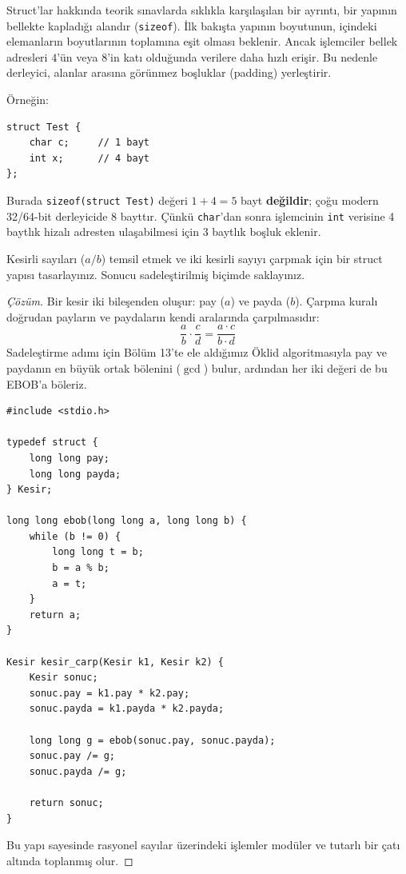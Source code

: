 Struct'lar hakkında teorik sınavlarda sıklıkla karşılaşılan bir ayrıntı, bir yapının bellekte kapladığı alandır (\lstinline|sizeof|).
İlk bakışta yapının boyutunun, içindeki elemanların boyutlarının toplamına eşit olması beklenir. Ancak işlemciler bellek adresleri $4$'ün veya $8$'in katı olduğunda verilere daha hızlı erişir. Bu nedenle derleyici, alanlar arasına görünmez boşluklar (padding) yerleştirir.

Örneğin:
\begin{lstlisting}[language=CTemel]
struct Test {
    char c;     // 1 bayt
    int x;      // 4 bayt
};
\end{lstlisting}
Burada \lstinline|sizeof(struct Test)| değeri $1 + 4 = 5$ bayt \textbf{değildir}; çoğu modern 32/64-bit derleyicide $8$ bayttır. Çünkü \lstinline|char|'dan sonra işlemcinin \lstinline|int| verisine 4 baytlık hizalı adresten ulaşabilmesi için 3 baytlık boşluk eklenir.

\begin{example}
Kesirli sayıları ($a/b$) temsil etmek ve iki kesirli sayıyı çarpmak için bir struct yapısı tasarlayınız. Sonucu sadeleştirilmiş biçimde saklayınız.
\end{example}

\begin{proof}[Çözüm]
Bir kesir iki bileşenden oluşur: pay ($a$) ve payda ($b$). Çarpma kuralı doğrudan payların ve paydaların kendi aralarında çarpılmasıdır:
\[
\frac{a}{b} \cdot \frac{c}{d} = \frac{a \cdot c}{b \cdot d}
\]
Sadeleştirme adımı için Bölüm 13'te ele aldığımız Öklid algoritmasıyla pay ve paydanın en büyük ortak bölenini ($\gcd$) bulur, ardından her iki değeri de bu EBOB'a böleriz.

\begin{lstlisting}[language=CTemel]
#include <stdio.h>

typedef struct {
    long long pay;
    long long payda;
} Kesir;

long long ebob(long long a, long long b) {
    while (b != 0) {
        long long t = b;
        b = a % b;
        a = t;
    }
    return a;
}

Kesir kesir_carp(Kesir k1, Kesir k2) {
    Kesir sonuc;
    sonuc.pay = k1.pay * k2.pay;
    sonuc.payda = k1.payda * k2.payda;
    
    long long g = ebob(sonuc.pay, sonuc.payda);
    sonuc.pay /= g;
    sonuc.payda /= g;
    
    return sonuc;
}
\end{lstlisting}
Bu yapı sayesinde rasyonel sayılar üzerindeki işlemler modüler ve tutarlı bir çatı altında toplanmış olur.
\end{proof}

